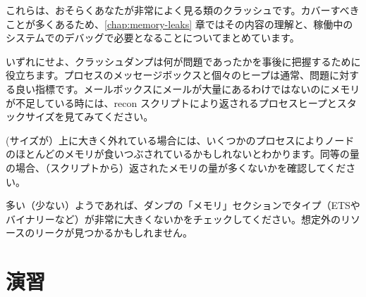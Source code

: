 これらは、おそらくあなたが非常によく見る類のクラッシュです。カバーすべきことが多くあるため、\ref{chap:memory-leaks} 章ではその内容の理解と、稼働中のシステムでのデバッグで必要となることについてまとめています。

いずれにせよ、クラッシュダンプは何が問題であったかを事後に把握するために役立ちます。プロセスのメッセージボックスと個々のヒープは通常、問題に対する良い指標です。メールボックスにメールが大量にあるわけではないのにメモリが不足している時には、recon スクリプトにより返されるプロセスヒープとスタックサイズを見てみてください。

(サイズが）上に大きく外れている場合には、いくつかのプロセスによりノードのほとんどのメモリが食いつぶされているかもしれないとわかります。同等の量の場合、（スクリプトから）返されたメモリの量が多くないかを確認してください。

多い（少ない）ようであれば、ダンプの「メモリ」セクションでタイプ（ETSやバイナリーなど）が非常に大きくないかをチェックしてください。想定外のリソースのリークが見つかるかもしれません。

\section{演習}

